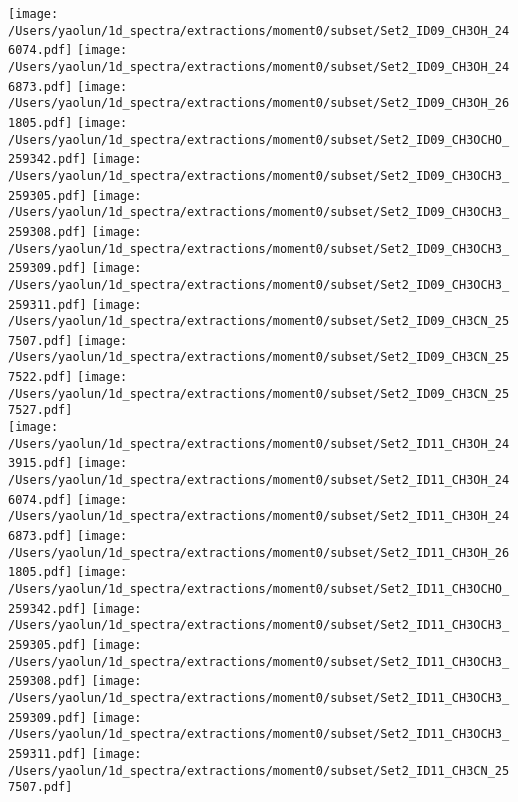 \begin{figure*}[htbp!]
  \texttt{[image: /Users/yaolun/1d\_spectra/extractions/moment0/subset/Set2\_ID09\_CH3OH\_246074.pdf]}
  \texttt{[image: /Users/yaolun/1d\_spectra/extractions/moment0/subset/Set2\_ID09\_CH3OH\_246873.pdf]}
  \texttt{[image: /Users/yaolun/1d\_spectra/extractions/moment0/subset/Set2\_ID09\_CH3OH\_261805.pdf]}
  \texttt{[image: /Users/yaolun/1d\_spectra/extractions/moment0/subset/Set2\_ID09\_CH3OCHO\_259342.pdf]}
  \texttt{[image: /Users/yaolun/1d\_spectra/extractions/moment0/subset/Set2\_ID09\_CH3OCH3\_259305.pdf]}
  \texttt{[image: /Users/yaolun/1d\_spectra/extractions/moment0/subset/Set2\_ID09\_CH3OCH3\_259308.pdf]}
  \texttt{[image: /Users/yaolun/1d\_spectra/extractions/moment0/subset/Set2\_ID09\_CH3OCH3\_259309.pdf]}
  \texttt{[image: /Users/yaolun/1d\_spectra/extractions/moment0/subset/Set2\_ID09\_CH3OCH3\_259311.pdf]}
  \texttt{[image: /Users/yaolun/1d\_spectra/extractions/moment0/subset/Set2\_ID09\_CH3CN\_257507.pdf]}
  \texttt{[image: /Users/yaolun/1d\_spectra/extractions/moment0/subset/Set2\_ID09\_CH3CN\_257522.pdf]}
  \texttt{[image: /Users/yaolun/1d\_spectra/extractions/moment0/subset/Set2\_ID09\_CH3CN\_257527.pdf]}
  \\
  \texttt{[image: /Users/yaolun/1d\_spectra/extractions/moment0/subset/Set2\_ID11\_CH3OH\_243915.pdf]}
  \texttt{[image: /Users/yaolun/1d\_spectra/extractions/moment0/subset/Set2\_ID11\_CH3OH\_246074.pdf]}
  \texttt{[image: /Users/yaolun/1d\_spectra/extractions/moment0/subset/Set2\_ID11\_CH3OH\_246873.pdf]}
  \texttt{[image: /Users/yaolun/1d\_spectra/extractions/moment0/subset/Set2\_ID11\_CH3OH\_261805.pdf]}
  \texttt{[image: /Users/yaolun/1d\_spectra/extractions/moment0/subset/Set2\_ID11\_CH3OCHO\_259342.pdf]}
  \texttt{[image: /Users/yaolun/1d\_spectra/extractions/moment0/subset/Set2\_ID11\_CH3OCH3\_259305.pdf]}
  \texttt{[image: /Users/yaolun/1d\_spectra/extractions/moment0/subset/Set2\_ID11\_CH3OCH3\_259308.pdf]}
  \texttt{[image: /Users/yaolun/1d\_spectra/extractions/moment0/subset/Set2\_ID11\_CH3OCH3\_259309.pdf]}
  \texttt{[image: /Users/yaolun/1d\_spectra/extractions/moment0/subset/Set2\_ID11\_CH3OCH3\_259311.pdf]}
  \texttt{[image: /Users/yaolun/1d\_spectra/extractions/moment0/subset/Set2\_ID11\_CH3CN\_257507.pdf]}

\end{figure*}
